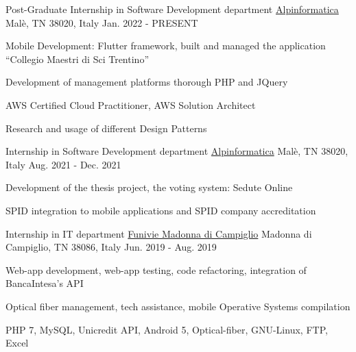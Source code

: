 

\begin{cventries}
  \cventry
    {Post-Graduate Internship in Software Development department} %
    {\href{https://www.alpinformatica.com/}{Alpinformatica}} %
    {Malè, TN 38020, Italy} %
    {Jan. 2022 - PRESENT} %
    {
      \begin{cvitems} %
        \item {Mobile Development: Flutter framework, built and managed the application ``Collegio Maestri di Sci Trentino''}
        \item {Development of management platforms thorough PHP and JQuery}
        \item {AWS Certified Cloud Practitioner, AWS Solution Architect}
        \item {Research and usage of different Design Patterns}
      \end{cvitems}
      }
  \cventry
    {Internship in Software Development department} %
    {\href{https://www.alpinformatica.com/}{Alpinformatica}} %
    {Malè, TN 38020, Italy} %
    {Aug. 2021 - Dec. 2021} %
    {
      \begin{cvitems} %
        \item {Development of the thesis project, the voting system: Sedute Online}
        \item {SPID integration to mobile applications and SPID company accreditation}
      \end{cvitems}
      }
  \cventry
    {Internship in IT department} %
    {\href{https://www.funiviecampiglio.it}{Funivie Madonna di Campiglio}} %
    {Madonna di Campiglio, TN 38086, Italy} %
    {Jun. 2019 - Aug. 2019} %
    {
      \begin{cvitems} %
        \item {Web-app development, web-app testing, code refactoring, integration of BancaIntesa's API}
        \item {Optical fiber management, tech assistance, mobile Operative Systems compilation}
        \item {PHP 7, MySQL, Unicredit API, Android 5, Optical-fiber, GNU-Linux, FTP, Excel}
      \end{cvitems}
      }
    


\end{cventries}
